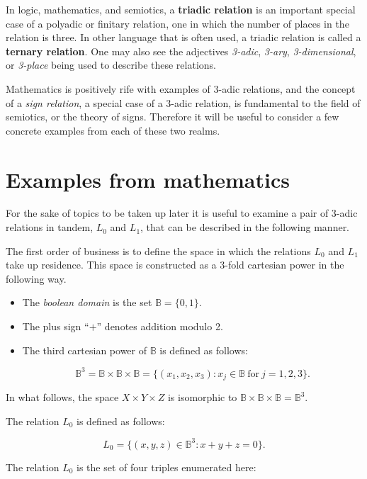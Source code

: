 \documentclass[12pt]{article}
\begin{document}
In logic, mathematics, and semiotics, a \textbf{triadic relation} is an important special case of a polyadic or finitary relation, one in which the number of places in the relation is three.  In other language that is often used, a triadic relation is called a \textbf{ternary relation}.  One may also see the adjectives \textit{3-adic}, \textit{3-ary}, \textit{3-dimensional}, or \textit{3-place} being used to describe these relations.

Mathematics is positively rife with examples of 3-adic relations, and the concept of a \textit{sign relation}, a special case of a 3-adic relation, is fundamental to the field of semiotics, or the theory of signs.  Therefore it will be useful to consider a few concrete examples from each of these two realms.

\section{Examples from mathematics}

For the sake of topics to be taken up later it is useful to examine a pair of 3-adic relations in tandem, $L_0$ and $L_1$, that can be described in the following manner.

The first order of business is to define the space in which the relations $L_0$ and $L_1$ take up residence.  This space is constructed as a 3-fold cartesian power in the following way.

\begin{itemize}
\item
The \textit{boolean domain} is the set $\mathbb{B} = \{ 0, 1 \}.$
\item
The plus sign ``$+$'' denotes addition modulo 2.
\item
The third cartesian power of $\mathbb{B}$ is defined as follows:

\[ \mathbb{B}^3 = \mathbb{B} \times \mathbb{B} \times \mathbb{B} = \{ (x_1, x_2, x_3) : x_j \in \mathbb{B}\ \mbox{for}\ j = 1, 2, 3 \}. \]
\end{itemize}

In what follows, the space $X \times Y \times Z$ is isomorphic to $\mathbb{B} \times \mathbb{B} \times \mathbb{B} = \mathbb{B}^3.$

The relation $L_0$ is defined as follows:

\[ L_0 = \{ (x, y, z) \in \mathbb{B}^3 : x + y + z = 0 \}. \]

The relation $L_0$ is the set of four triples enumerated here:
\end{document}
